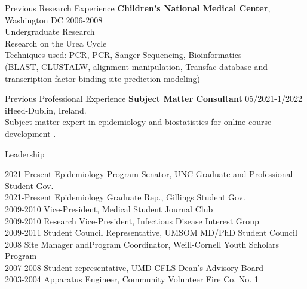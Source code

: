 \documentclass{resume} %
\begin{document}
\begin{rSection}{Previous Research Experience}
   {\bf Children’s National Medical Center}{, Washington DC} \hfill {2006-2008}
   \\ 
   Undergraduate Research\\
   Research on the Urea Cycle\\
   Techniques used: PCR, PCR, Sanger Sequencing, Bioinformatics\\ (BLAST, CLUSTALW, alignment manipulation, Transfac database and\\ transcription factor binding site prediction modeling)
   \end{rSection}

   
\begin{rSection}{Previous Professional Experience}
{\bf Subject Matter Consultant } \hfill {05/2021-1/2022}
\\ 
iHeed-Dublin, Ireland. 
\\
Subject matter expert in epidemiology and biostatistics for online course development .

\end{rSection}

   
   \begin{rSection}{Leadership}

   2021-Present \enspace Epidemiology Program Senator, UNC Graduate and Professional Student Gov.\\ 
   2021-Present \enspace Epidemiology Graduate Rep., Gillings Student Gov.\\
   2009-2010 \enspace Vice-President, Medical Student Journal Club\\
   2009-2010 \enspace Research Vice-President, Infectious Disease Interest Group\\
   2009-2011 \enspace Student Council Representative, UMSOM MD/PhD Student Council\\
   2008 \hspace{27.5pt} Site Manager andProgram Coordinator, Weill-Cornell Youth Scholars Program\\
   2007-2008 \enspace Student representative, UMD CFLS Dean’s Advisory Board\\
   2003-2004 \enspace Apparatus Engineer, Community Volunteer Fire Co. No. 1
   
   \end{rSection}
   
\end{document}
